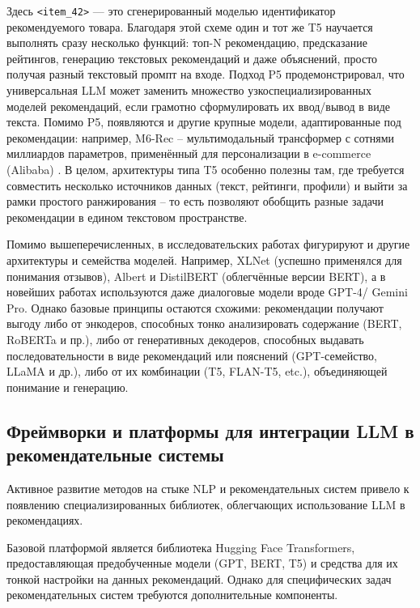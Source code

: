 Здесь \texttt{<item\_42>} — это сгенерированный моделью идентификатор рекомендуемого товара. Благодаря этой схеме один и тот же T5 научается выполнять сразу несколько функций: топ-N рекомендацию, предсказание рейтингов, генерацию текстовых рекомендаций и даже объяснений, просто получая разный текстовый промпт на входе. Подход P5 продемонстрировал, что универсальная LLM может заменить множество узкоспециализированных моделей рекомендаций, если грамотно сформулировать их ввод/вывод в виде текста. Помимо P5, появляются и другие крупные модели, адаптированные под рекомендации: например, M6-Rec – мультимодальный трансформер с сотнями миллиардов параметров, применённый для персонализации в e-commerce (Alibaba) \citep{cui2022m6recgenerativepretrainedlanguage}. В целом, архитектуры типа T5 особенно полезны там, где требуется совместить несколько источников данных (текст, рейтинги, профили) и выйти за рамки простого ранжирования – то есть позволяют обобщить разные задачи рекомендации в едином текстовом пространстве.

Помимо вышеперечисленных, в исследовательских работах фигурируют и другие архитектуры и семейства моделей. Например, XLNet (успешно применялся для понимания отзывов), Albert и DistilBERT (облегчённые версии BERT), а в новейших работах используются даже диалоговые модели вроде GPT-4/ Gemini Pro. Однако базовые принципы остаются схожими: рекомендации получают выгоду либо от энкодеров, способных тонко анализировать содержание (BERT, RoBERTa и пр.), либо от генеративных декодеров, способных выдавать последовательности в виде рекомендаций или пояснений (GPT-семейство, LLaMA и др.), либо от их комбинации (T5, FLAN-T5, etc.), объединяющей понимание и генерацию.


\subsection*{Фреймворки и платформы для интеграции LLM в рекомендательные системы}

Активное развитие методов на стыке NLP и рекомендательных систем привело к появлению специализированных библиотек, облегчающих использование LLM в рекомендациях.

Базовой платформой является библиотека Hugging Face Transformers, предоставляющая предобученные модели (GPT, BERT, T5) и средства для их тонкой настройки на данных рекомендаций. Однако для специфических задач рекомендательных систем требуются дополнительные компоненты.

